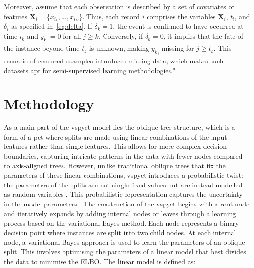 \documentclass[3p,review,authoryear]{elsarticle}
\newcommand{\mpop}[2]{{\color{orange}\sout{#1}\color{purple}{#2}}}
\begin{document}
Moreover, assume that each observation is described by a set of covariates or features $\mathbf{X}_i=\{x_{i_1},\ldots,x_{i_N}\}$.
Thus, each record $i$ comprises the variables $\mathbf{X}_i$, $t_i$, and $\delta_i$ as specified in~\eqref{eq:delta}.
If $\delta_k=1$, the event is confirmed to have occurred at time $t_k$ and $y_{k_j} = 0$ for all $j \geq{k}$.
Conversely, if $\delta_k=0$, it implies that the fate of the instance beyond time $t_k$ is unknown, making $y_{k_j}$ missing for $j \geq{t_k}$.
This scenario of censored examples introduces missing data, which makes such datasets apt for semi-supervised learning methodologies."


\section{Methodology}

As a main part of the \gls{vspyct} model lies the oblique tree structure, which is a form of a \gls{pct} where splits are made using linear combinations of the input features rather than single features.
This allows for more complex decision boundaries, capturing intricate patterns in the data with fewer nodes compared to axis-aligned trees.
However, unlike traditional oblique trees that fix the parameters of these linear combinations, \gls{vspyct} introduces a probabilistic twist: the parameters of the splits are \mpop{not single fixed values but are instead}{} modelled as random variables .
This probabilistic representation captures the uncertainty in the model parameters .
The construction of the \gls{vspyct} begins with a root node and iteratively expands by adding internal nodes or leaves through a learning process based on the variational Bayes method.
Each node represents a binary decision point where instances are split into two child nodes.
At each internal node, a variational Bayes approach is used to learn the parameters of an oblique split.
 {This involves optimising the parameters of a linear model that best divides the data to minimise the ELBO.}
The linear model is defined as:
\end{document}
